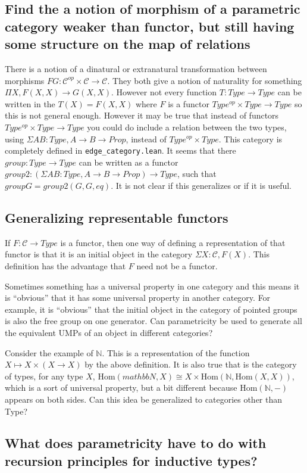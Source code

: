\documentclass[12pt]{article} %
\theoremstyle{definition}
\theoremstyle{definition}
\theoremstyle{definition}
\theoremstyle{definition}
\begin{document}
\subsection{Find the a notion of morphism of a parametric category weaker than functor, but
  still having some structure on the map of relations}

There is a notion of a dinatural or extranatural transformation between morphisms 
$F G : \mathcal{C}^{op} \times \mathcal{C} \rightarrow \mathcal{C}$. They both give 
a notion of naturality for something $\Pi X, F(X, X) \rightarrow G(X,X)$. However not
every function $T : Type \rightarrow Type$ can be written in the $T(X) = F(X, X)$ where 
$F$ is a functor $Type^{op} \times Type \rightarrow Type$ so this is not general enough. 
However it may be true that instead of functors $Type^{op} \times Type \rightarrow Type$
you could do include a relation between the two types, using $\Sigma A B : Type, A \rightarrow B \rightarrow Prop$,
instead of $Type^{op} \times Type$. This category is completely defined in \lstinline{edge_category.lean}.
It seems that there $group : Type \rightarrow Type$ can be written as a functor
$group2 : (\Sigma A B : Type, A \rightarrow B \rightarrow Prop) \rightarrow Type$, such that 
$group G = group2(G, G, eq)$. It is not clear if this generalizes or if it is useful.

\subsection{Generalizing representable functors}
If $F : \mathcal{C} \rightarrow Type$ is a functor, then one way of defining a representation
of that functor is that it is an initial object in the category $\Sigma X : \mathcal{C}, F(X)$.
This definition has the advantage that $F$ need not be a functor.

Sometimes something has a universal property in one category and this means it is ``obvious'' that 
it has some universal property in another category. For example, it is ``obvious'' that the initial
object in the category of pointed groups is also the free group on one generator. Can parametricity be used 
to generate all the equivalent UMPs of an object in different categories?

Consider the example of $\mathbb{N}$. This is a representation of the function 
$X \mapsto X \times (X \rightarrow X)$ 
by the above definition. It is also true that is the category of types, for any type $X$, $\text{Hom}(
mathbb{N}, X) \cong X \times \text{Hom}(\mathbb{N}, \text{Hom}(X, X))$, which is a sort of universal property,
but a bit different because $\text{Hom}(\mathbb{N}, -)$ appears on both sides. Can this idea be generalized
to categories other than Type?

\subsection{What does parametricity have to do with recursion principles for inductive types?}


\end{document}
